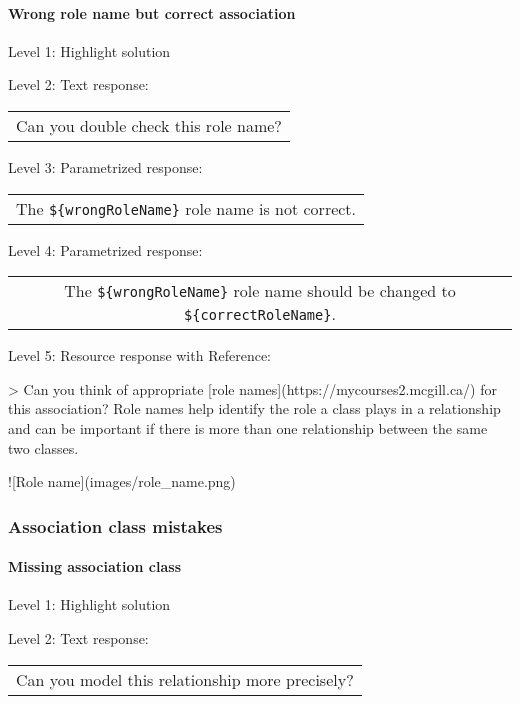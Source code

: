 \paragraph{Wrong role name but correct association}

\noindent Level 1: Highlight solution \medskip

\noindent Level 2: Text response: \medskip

\begin{tabular}{|c}
Can you double check this role name?
\end{tabular} \medskip

\noindent Level 3: Parametrized response: \medskip

\begin{tabular}{|c}
The \verb|${wrongRoleName}| role name is not correct.
\end{tabular} \medskip

\noindent Level 4: Parametrized response: \medskip

\begin{tabular}{|c}
The \verb|${wrongRoleName}| role name should be changed to \verb|${correctRoleName}|.
\end{tabular} \medskip

\noindent Level 5: Resource response with Reference:

> Can you think of appropriate [role names](https://mycourses2.mcgill.ca/)
for this association? Role names help identify the role a class plays in a
relationship and can be important if there is more than one relationship
between the same two classes.

![Role name](images/role_name.png)



\subsubsection{Association class mistakes}

\paragraph{Missing association class}

\noindent Level 1: Highlight solution \medskip

\noindent Level 2: Text response: \medskip

\begin{tabular}{|c}
Can you model this relationship more precisely?
\end{tabular} \medskip

